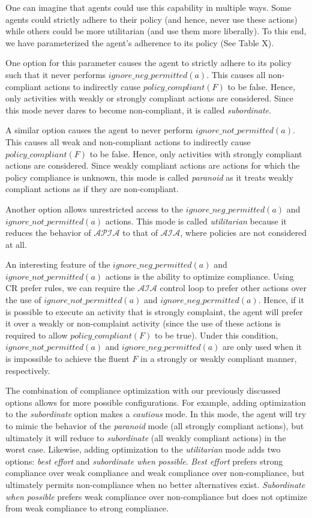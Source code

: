 One can imagine that agents could use this capability in multiple ways.
Some agents could strictly adhere to their policy (and hence, never use these actions) while others could be more utilitarian (and use them more liberally).
To this end, we have parameterized the agent's adherence to its policy (See Table X).

One option for this parameter causes the agent to strictly adhere to its policy such that it never performs $ignore\_neg\_permitted(a)$.
This causes all non-compliant actions to indirectly cause $policy\_compliant(F)$ to be false.
Hence, only activities with weakly or strongly compliant actions are considered.
Since this mode never dares to become non-compliant, it is called \textit{subordinate}.

A similar option causes the agent to never perform $ignore\_not\_permitted(a)$.
This causes all weak and non-compliant actions to indirectly cause $policy\_compliant(F)$ to be false.
Hence, only activities with strongly compliant actions are considered.
Since weakly compliant actions are actions for which the policy compliance is unknown, this mode is called \textit{paranoid} as it treats weakly compliant actions as if they are non-compliant.

Another option allows unrestricted access to the $ignore\_neg\_permitted(a)$ and $ignore\_not\_permitted(a)$ actions.
This mode is called \textit{utilitarian} because it reduces the behavior of $\mathcal{APIA}$ to that of $\mathcal{AIA}$, where policies are not considered at all.

An interesting feature of the $ignore\_neg\_permitted(a)$ and $ignore\_not\_permitted(a)$ actions is the ability to optimize compliance.
Using CR prefer rules, we can require the $\mathcal{AIA}$ control loop to prefer other actions over the use of $ignore\_not\_permitted(a)$ and $ignore\_neg\_permitted(a)$.
Hence, if it is possible to execute an activity that is strongly complaint, the agent will prefer it over a weakly or non-complaint activity (since the use of these actions is required to allow $policy\_compliant(F)$ to be true).
Under this condition, $ignore\_not\_permitted(a)$ and $ignore\_neg\_permitted(a)$ are only used when it is impossible to achieve the fluent $F$ in a strongly or weakly compliant manner, respectively.

The combination of compliance optimization with our previously discussed options allows for more possible configurations.
For example, adding optimization to the \textit{subordinate} option makes a \textit{cautious} mode.
In this mode, the agent will try to mimic the behavior of the \textit{paranoid} mode (all strongly compliant actions), but ultimately it will reduce to \textit{subordinate} (all weakly compliant actions) in the worst case.
Likewise, adding optimization to the \textit{utilitarian} mode adds two options: \textit{best effort} and \textit{subordinate when possible}.
\textit{Best effort} prefers strong compliance over weak compliance and weak compliance over non-compliance, but ultimately permits non-compliance when no better alternatives exist.
\textit{Subordinate when possible} prefers weak compliance over non-compliance but does not optimize from weak compliance to strong compliance.

